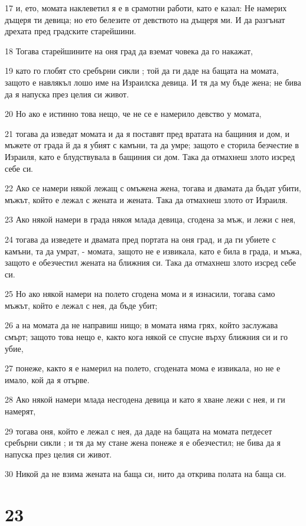 \par 17 и, ето, момата наклеветил я е в срамотни работи, като е казал: Не намерих дъщеря ти девица; но ето белезите от девството на дъщеря ми. И да разгънат дрехата пред градските старейшини.
\par 18 Тогава старейшините на оня град да вземат човека да го накажат,
\par 19 като го глобят сто сребърни сикли ; той да ги даде на бащата на момата, защото е навлякъл лошо име на Израилска девица. И тя да му бъде жена; не бива да я напуска през целия си живот.
\par 20 Но ако е истинно това нещо, че не се е намерило девство у момата,
\par 21 тогава да изведат момата и да я поставят пред вратата на бащиния и дом, и мъжете от града й да я убият с камъни, та да умре; защото е сторила безчестие в Израиля, като е блудствувала в бащиния си дом. Така да отмахнеш злото изсред себе си.
\par 22 Ако се намери някой лежащ с омъжена жена, тогава и двамата да бъдат убити, мъжът, който е лежал с жената и жената. Така да отмахнеш злото от Израиля.
\par 23 Ако някой намери в града някоя млада девица, сгодена за мъж, и лежи с нея,
\par 24 тогава да изведете и двамата пред портата на оня град, и да ги убиете с камъни, та да умрат, - момата, защото не е извикала, като е била в града, и мъжа, защото е обезчестил жената на ближния си. Така да отмахнеш злото изсред себе си.
\par 25 Но ако някой намери на полето сгодена мома и я изнасили, тогава само мъжът, който е лежал с нея, да бъде убит;
\par 26 а на момата да не направиш нищо; в момата няма грях, който заслужава смърт; защото това нещо е, както кога някой се спусне върху ближния си и го убие,
\par 27 понеже, както я е намерил на полето, сгодената мома е извикала, но не е имало, кой да я отърве.
\par 28 Ако някой намери млада несгодена девица и като я хване лежи с нея, и ги намерят,
\par 29 тогава оня, който е лежал с нея, да даде на бащата на момата петдесет сребърни сикли ; и тя да му стане жена понеже я е обезчестил; не бива да я напуска през целия си живот.
\par 30 Никой да не взима жената на баща си, нито да открива полата на баща си.

\chapter{23}

